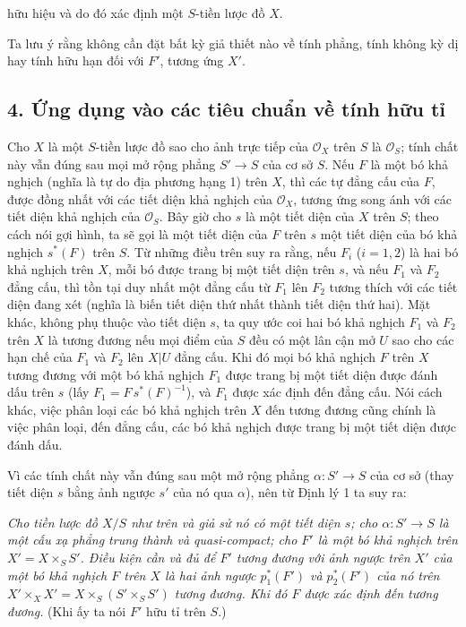 hữu hiệu và do đó xác định một $S$-tiền lược đồ $X$.

Ta lưu ý rằng không cần đặt bất kỳ giả thiết nào về tính phẳng, tính không kỳ
dị hay tính hữu hạn đối với $F'$, tương ứng $X'$.

\subsection*{4. Ứng dụng vào các tiêu chuẩn về tính hữu tỉ}

Cho $X$ là một $S$-tiền lược đồ sao cho ảnh trực tiếp của $\mathcal O_X$ trên
$S$ là $\mathcal O_S$; tính chất này vẫn đúng sau mọi mở rộng phẳng
$S'\longrightarrow S$ của cơ sở $S$. Nếu $F$ là một bó khả nghịch (nghĩa là
tự do địa phương hạng 1) trên $X$, thì các tự đẳng cấu của $F$, được đồng nhất
với các tiết diện khả nghịch của $\mathcal O_X$, tương ứng song ánh với các
tiết diện khả nghịch của $\mathcal O_S$. Bây giờ cho $s$ là một tiết diện của
$X$ trên $S$; theo cách nói gợi hình, ta sẽ gọi là một tiết diện của $F$ trên
$s$ một tiết diện của bó khả nghịch $s^*(F)$ trên $S$. Từ những điều trên suy ra
rằng, nếu $F_i$ ($i=1,2$) là hai bó khả nghịch trên $X$, mỗi bó được trang bị
một tiết diện trên $s$, và nếu $F_1$ và $F_2$ đẳng cấu, thì tồn tại duy nhất
một đẳng cấu từ $F_1$ lên $F_2$ tương thích với các tiết diện đang xét (nghĩa
là biến tiết diện thứ nhất thành tiết diện thứ hai). Mặt khác, không phụ thuộc
vào tiết diện $s$, ta quy ước coi hai bó khả nghịch $F_1$ và $F_2$ trên $X$ là
tương đương nếu mọi điểm của $S$ đều có một lân cận mở $U$ sao cho các hạn chế
của $F_1$ và $F_2$ lên $X|U$ đẳng cấu. Khi đó mọi bó khả nghịch $F$ trên $X$
tương đương với một bó khả nghịch $F_1$ được trang bị một tiết diện được đánh
dấu trên $s$ (lấy $F_1=F\,s^*(F)^{-1}$), và $F_1$ được xác định đến đẳng cấu.
Nói cách khác, việc phân loại các bó khả nghịch trên $X$ đến tương đương cũng
chính là việc phân loại, đến đẳng cấu, các bó khả nghịch được trang bị một tiết
diện được đánh dấu.

Vì các tính chất này vẫn đúng sau một mở rộng phẳng
$\alpha:S'\longrightarrow S$ của cơ sở (thay tiết diện $s$ bằng ảnh ngược $s'$
của nó qua $\alpha$), nên từ Định lý 1 ta suy ra:

\emph{Cho tiền lược đồ $X/S$ như trên và giả sử nó có một tiết diện $s$; cho
$\alpha:S'\longrightarrow S$ là một cấu xạ phẳng trung thành và quasi-compact;
cho $F'$ là một bó khả nghịch trên $X'=X\times_SS'$. Điều kiện cần và đủ để
$F'$ tương đương với ảnh ngược trên $X'$ của một bó khả nghịch $F$ trên $X$ là
hai ảnh ngược $p_1^*(F')$ và $p_2^*(F')$ của nó trên
$X'\times_XX'=X\times_S(S'\times_SS')$ tương đương. Khi đó $F$ được xác định
đến tương đương.} (Khi ấy ta nói $F'$ hữu tỉ trên $S$.)

